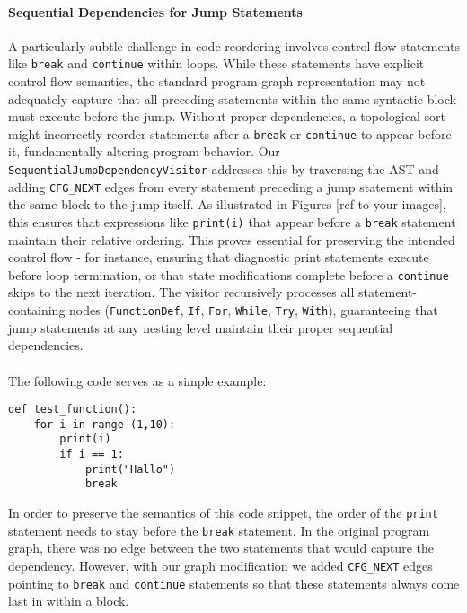 \documentclass[%
thesis=student,%
coverpage=false,%
titlepage=false,%
headmarks=true, %
english,%
font=libertine, %
math=newpxtx, %
BCOR=5mm,%
coverBCOR=11mm%
]{tum-templates/book/tumbook}
\begin{document}
\paragraph{Sequential Dependencies for Jump Statements}
A particularly subtle challenge in code reordering involves control flow statements like \texttt{break} and \texttt{continue} within loops. While these statements have explicit control flow semantics, the standard program graph representation may not adequately capture that all preceding statements within the same syntactic block must execute before the jump. Without proper dependencies, a topological sort might incorrectly reorder statements after a \texttt{break} or \texttt{continue} to appear before it, fundamentally altering program behavior. Our \texttt{SequentialJumpDependencyVisitor} addresses this by traversing the AST and adding \texttt{CFG\_NEXT} edges from every statement preceding a jump statement within the same block to the jump itself. As illustrated in Figures [ref to your images], this ensures that expressions like \texttt{print(i)} that appear before a \texttt{break} statement maintain their relative ordering. This proves essential for preserving the intended control flow - for instance, ensuring that diagnostic print statements execute before loop termination, or that state modifications complete before a \texttt{continue} skips to the next iteration. The visitor recursively processes all statement-containing nodes (\texttt{FunctionDef}, \texttt{If}, \texttt{For}, \texttt{While}, \texttt{Try}, \texttt{With}), guaranteeing that jump statements at any nesting level maintain their proper sequential dependencies. \\ \\
The following code serves as a simple example:

\begin{lstlisting}[style=pythonstyle, caption={The break-statement needs to come after the print statement in any valid reordering}]
def test_function():
    for i in range (1,10):
        print(i)
        if i == 1:
            print("Hallo")
            break
\end{lstlisting}

In order to preserve the semantics of this code snippet, the order of the \texttt{print} statement needs to stay before the \texttt{break} statement. In the original program graph, there was no edge between the two statements that would capture the dependency. However, with our graph modification we added \texttt{CFG\_NEXT} edges pointing to \texttt{break} and \texttt{continue} statements so that these statements always come last in within a block.
\end{document}
